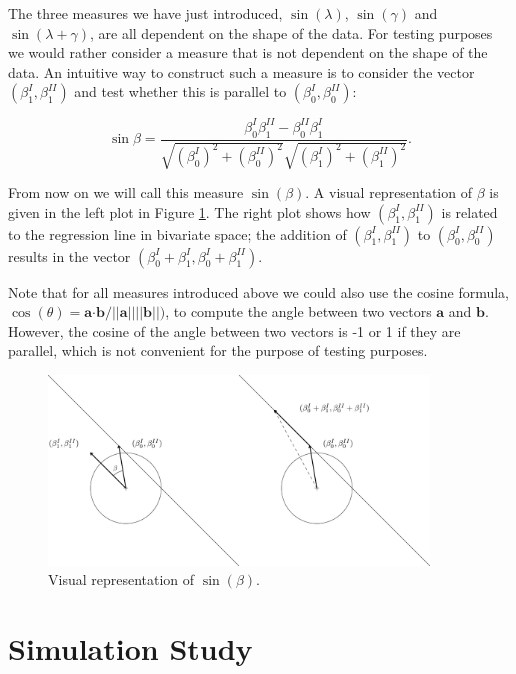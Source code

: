 \documentclass[]{interact}
\begin{document}
The three measures we have just introduced, $\sin(\lambda)$, $\sin(\gamma)$ and
$\sin(\lambda + \gamma)$, are all dependent on the shape of the data. For
testing purposes we would rather consider a measure that is not dependent on the
shape of the data. An intuitive way to construct such a measure is to consider
the vector $(\beta^I_1, \beta^{II}_1)$ and test whether this is parallel to
$(\beta^I_0, \beta^{II}_0)$:

\begin{equation}
\sin{\beta} = \frac{\beta^I_0\beta^{II}_1 - \beta^{II}_0\beta^{I}_1}{\sqrt{(\beta^I_0)^2 + (\beta^{II}_0)^2}\sqrt{(\beta^I_1)^2 + (\beta^{II}_1)^2}}.
\end{equation}

\noindent From now on we will call this measure $\sin(\beta)$. A visual representation of
$\beta$ is given in the left plot in Figure \ref{figDet}. The right plot shows
how $(\beta^I_1, \beta^{II}_1)$ is related to the regression line in bivariate
space; the addition of $(\beta^I_1, \beta^{II}_1)$ to $(\beta^I_0,
\beta^{II}_0)$ results in the vector $(\beta^I_0 + \beta^I_1, \beta^I_0 +
\beta^{II}_1)$.

Note that for all measures introduced above we could also use the cosine
formula, $\cos(\theta) = \boldsymbol{a} \boldsymbol{\cdot} \boldsymbol{b} /
||\boldsymbol{a}||||\boldsymbol{b}||)$, to compute the angle between two vectors
$\boldsymbol{a}$ and $\boldsymbol{b}$. However, the cosine of the angle between two vectors is -1 or 1 if they
are parallel, which is not convenient for the purpose of testing purposes.

\begin{figure}
\centering
\includegraphics[width = 0.9\textwidth]{Determinant.pdf}
\caption{Visual representation of $\sin(\beta)$.} 
\label{figDet}
\end{figure}

\section{Simulation Study}\label{simulation}
\end{document}
